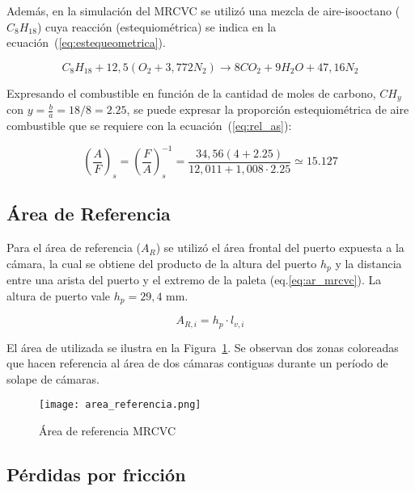 Además, en la simulación del MRCVC se utilizó una mezcla  de aire-isooctano
($C_{8}H_{18}$) cuya reacción (estequiométrica) se indica en la
ecuación~(\ref{eq:estequeometrica}).


\begin{equation} \label{eq:estequeometrica}
  C_{8}H_{18} + 12,5 \left(O_{2}+3,772N_{2}\right) \rightarrow 8 CO_{2} + 9 H_{2}O + 47,16 N_{2}
\end{equation}

Expresando el combustible en función de la cantidad de moles de carbono,
$CH_{y}$ con $y=\frac{b}{a}=18/8=2.25$, se puede expresar la proporción
estequiométrica de aire combustible que se requiere con la
ecuación~(\ref{eq:rel_as}):

\begin{equation} \label{eq:rel_as}
  \left(\frac{A}{F}\right)_{s} = \left(\frac{F}{A}\right)_{s}^{-1} = \frac{34,56(4+2.25)}{12,011 + 1,008\cdot 2.25} \simeq 15.127
\end{equation}

\subsection{Área de Referencia}
%
Para el área de referencia ($A_{R}$) se utilizó el área frontal del puerto
expuesta a la cámara, la cual se obtiene del producto de la altura del puerto
$h_{p}$ y la distancia entre una arista del puerto y el extremo de la paleta
(eq.\ref{eq:ar_mrcvc}).
%
La altura de puerto vale $h_{p}=29,4$ mm.

\begin{equation}\label{eq:ar_mrcvc} 
    A_{R,i} = h_{p} \cdot l_{v,i}
\end{equation}

El área de utilizada se ilustra en la Figura~\ref{fig:area_referencia}.
%
Se observan dos zonas coloreadas que hacen referencia al área de dos cámaras
contiguas durante un período de solape de cámaras.


\begin{figure}
  \centering
  \texttt{[image: area\_referencia.png]}
  \caption{Área de referencia MRCVC}\label{fig:area_referencia}
\end{figure}

\subsection{Pérdidas por fricción}

